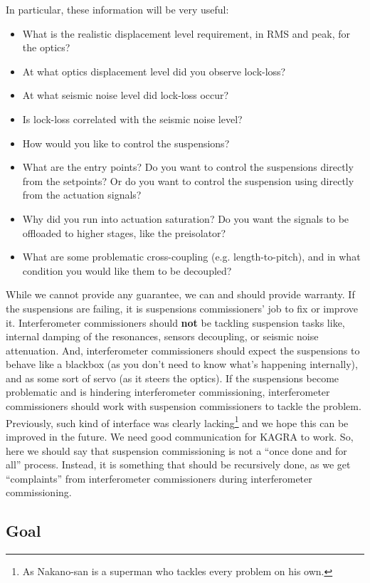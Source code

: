 In particular, these information will be very useful:
\begin{itemize}
	\item What is the realistic displacement level requirement, in RMS and peak, for the optics?
	\item At what optics displacement level did you observe lock-loss?
	\item At what seismic noise level did lock-loss occur?
	\item Is lock-loss correlated with the seismic noise level?
	\item How would you like to control the suspensions?
	\item What are the entry points? Do you want to control the suspensions directly from the setpoints? Or do you want to control the suspension using directly from the actuation signals?
	\item Why did you run into actuation saturation? Do you want the signals to be offloaded to higher stages, like the preisolator?
	\item What are some problematic cross-coupling (e.g. length-to-pitch), and in what condition you would like them to be decoupled?
\end{itemize}

While we cannot provide any guarantee, we can and should provide warranty.
If the suspensions are failing, it is suspensions commissioners' job to fix or improve it.
Interferometer commissioners should \textbf{not} be tackling suspension tasks like, internal damping of the resonances, sensors decoupling, or seismic noise attenuation.
And, interferometer commissioners should expect the suspensions to behave like a blackbox (as you don't need to know what's happening internally), and as some sort of servo (as it steers the optics).
If the suspensions become problematic and is hindering interferometer commissioning, interferometer commissioners should work with suspension commissioners to tackle the problem.
Previously, such kind of interface was clearly lacking\footnote{As Nakano-san is a superman who tackles every problem on his own.} and we hope this can be improved in the future.
We need good communication for KAGRA to work.
So, here we should say that suspension commissioning is not a ``once done and for all'' process.
Instead, it is something that should be recursively done, as we get ``complaints'' from interferometer commissioners during interferometer commissioning.


\subsection{Goal}




